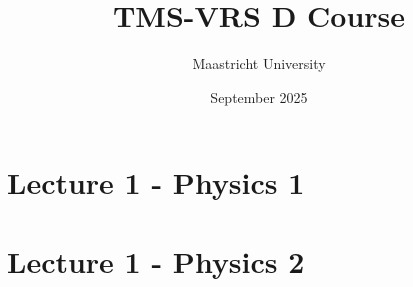 \documentclass{book}
\title{TMS-VRS D Course}
\author{Maastricht University}
\date{September 2025}
\begin{document}
\maketitle
\chapter{Lecture 1 - Physics 1}

\chapter{Lecture 1 - Physics 2}

\end{document}
